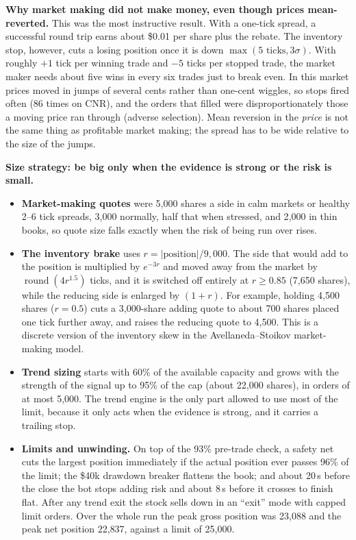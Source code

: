 \documentclass[10pt]{article}
\begin{document}
\textbf{Why market making did not make money, even though prices mean-reverted.} This was the most instructive result. With a one-tick spread, a successful round trip earns about \$0.01 per share
plus the rebate. The inventory stop, however, cuts a losing position once it is down $\max(5\text{ ticks}, 3\sigma)$. With roughly $+1$ tick per winning trade and $-5$ ticks per stopped trade,
the market maker needs about five wins in every six trades just to break even. In this market prices moved in jumps of several cents rather than one-cent wiggles, so stops fired often
(86 times on CNR), and the orders that filled were disproportionately those a moving price ran through (adverse selection). Mean reversion in the \emph{price} is not the same thing as profitable
market making; the spread has to be wide relative to the size of the jumps.

\textbf{Size strategy: be big only when the evidence is strong or the risk is small.}
\begin{itemize}
  \item \textbf{Market-making quotes} were 5{,}000 shares a side in calm markets or healthy 2--6 tick spreads, 3{,}000 normally, half that when stressed, and 2{,}000 in thin books, so quote
        size falls exactly when the risk of being run over rises.
  \item \textbf{The inventory brake} uses $r = |\text{position}|/9{,}000$. The side that would add to the position is multiplied by $e^{-3r}$ and moved away from the market by
        $\operatorname{round}(4r^{1.5})$ ticks, and it is switched off entirely at $r \ge 0.85$ (7{,}650 shares), while the reducing side is enlarged by $(1+r)$. For example, holding
        4{,}500 shares ($r = 0.5$) cuts a 3{,}000-share adding quote to about 700 shares placed one tick further away, and raises the reducing quote to 4{,}500. This is a discrete version of the
        inventory skew in the Avellaneda--Stoikov market-making model.
  \item \textbf{Trend sizing} starts with 60\% of the available capacity and grows with the strength of the signal up to 95\% of the cap (about 22{,}000 shares), in orders of at most 5{,}000.
        The trend engine is the only part allowed to use most of the limit, because it only acts when the evidence is strong, and it carries a trailing stop.
  \item \textbf{Limits and unwinding.} On top of the 93\% pre-trade check, a safety net cuts the largest position immediately if the actual position ever passes 96\% of the limit; the \$40k
        drawdown breaker flattens the book; and about 20\,s before the close the bot stops adding risk and about 8\,s before it crosses to finish flat. After any trend exit the stock sells down in
        an ``exit'' mode with capped limit orders. Over the whole run the peak gross position was 23{,}088 and the peak net position 22{,}837, against a limit of 25{,}000.
\end{itemize}
\end{document}
